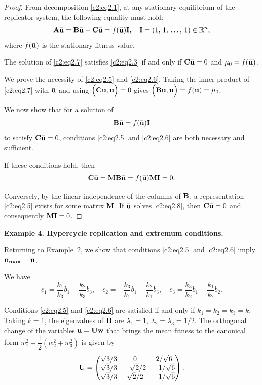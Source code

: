 \documentclass[12pt]{report}
\newcommand{\R}{\mathbb{R}}
\theoremstyle{definition}
\theoremstyle{remark}
\begin{document}
\begin{proof}
	From decomposition \eqref{c2:eq2.1}, at any stationary equilibrium of the replicator system, the following equality must hold:
	\begin{equation}
		{\bf A\bar{u} = B\bar{u} + C\bar{u}} = f({\bf \bar{u}}){\bf I}, \quad {\bf I} = (1,\, 1,\, \ldots,\, 1) \in \R^{n},
		\label{c2:eq2.7}
	\end{equation}
	where $f({\bf \bar{u}})$ is the stationary fitness value.
	
	The solution of \eqref{c2:eq2.7} satisfies \eqref{c2:eq2.3} if and only if ${\bf C\bar{u}} = 0$ and $\mu_{0} = f({\bf \bar{u}})$.
	
	We prove the necessity of \eqref{c2:eq2.5} and \eqref{c2:eq2.6}. Taking the inner product of \eqref{c2:eq2.7} with ${\bf \bar{u}}$ and using $\Big({\bf C\bar{u}, \bar{u}}\Big) = 0$ gives $\Big({\bf B\bar{u}, \bar{u}}\Big) = f({\bf \bar{u}}) = \mu_{0}$.
	
	We now show that for a solution of
	\begin{equation}
		{\bf B\bar{u}} = f({\bf \bar{u}}){\bf I}
		\label{c2:eq2.8}
	\end{equation}
	to satisfy ${\bf C\bar{u}} = 0$, conditions \eqref{c2:eq2.5} and \eqref{c2:eq2.6} are both necessary and sufficient.
	
	If these conditions hold, then
	$$
	{\bf C\bar{u} = MB\bar{u}} = f({\bf \bar{u}}){\bf MI} = 0.
	$$
	
	Conversely, by the linear independence of the columns of ${\bf B}$, a representation \eqref{c2:eq2.5} exists for some matrix ${\bf M}$. If ${\bf \bar{u}}$ solves \eqref{c2:eq2.8}, then ${\bf C\bar{u}} = 0$ and consequently ${\bf MI} = 0$. 
\end{proof}  

\medskip
\textbf{Example 4. Hypercycle replication and extremum conditions.}

Returning to Example~2, we show that conditions \eqref{c2:eq2.5} and \eqref{c2:eq2.6} imply ${\bf \bar{u}_{max}} = {\bf \bar{u}}$.

We have
$$
c_{1} = \frac{k_{1}}{k_{3}}b_{1} - \frac{k_{2}}{k_{3}}b_{3}, \quad c_{2} = -\frac{k_{3}}{k_{1}}b_{1} + \frac{k_{2}}{k_{1}}b_{3}, \quad c_{3} = \frac{k_{3}}{k_{2}}b_{1} - \frac{k_{1}}{k_{2}}b_{2}.
$$

Conditions \eqref{c2:eq2.5} and \eqref{c2:eq2.6} are satisfied if and only if $k_{1} = k_{2} = k_{3} = k$. Taking $k = 1$, the eigenvalues of ${\bf B}$ are $\lambda_{1} = 1$, $\lambda_{2} = \lambda_{3} = 1/2$. The orthogonal change of the variables ${\bf u = Uw}$ that brings the mean fitness to the canonical form $w_{1}^{2} - \dfrac{1}{2}(w_{2}^{2} + w_{3}^{2})$ is given by
$$
{\bf U} = 
\begin{pmatrix}
	\sqrt{3}/3 & 0 & 2/\sqrt{6}\\
	\sqrt{3}/3 & -\sqrt{2}/2 & -1/\sqrt{6}\\
	\sqrt{3}/3 & \sqrt{2}/2 & -1/\sqrt{6}\\
\end{pmatrix}.
$$ 
\end{document}
